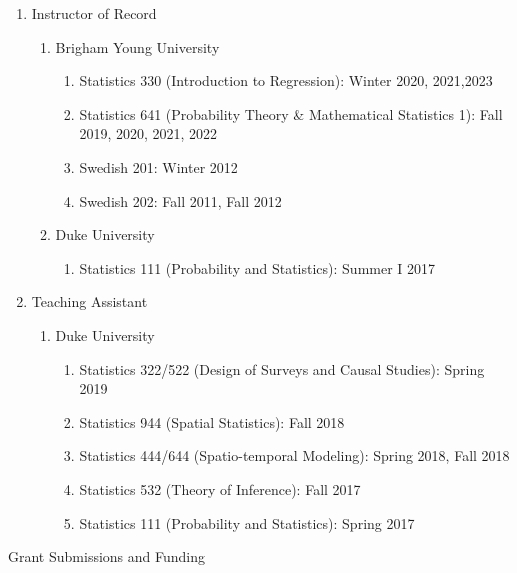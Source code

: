 \documentclass[11pt]{article}
\newcommand{\head}[1]{ %
    \bigskip %
    \begin{large}\begin{bf}{#1}\end{bf}\end{large} %

    \ \\ [-1.3cm] %

    \hrulefill}
\begin{document}
\begin{enumerate}[label=$\bullet$]
\item Instructor of Record
\begin{enumerate}[label=$\cdot$]
\item Brigham Young University
\begin{enumerate}[label=$\cdot$]
\item Statistics 330 (Introduction to Regression): Winter 2020, 2021,2023
\item Statistics 641 (Probability Theory \& Mathematical Statistics 1): Fall 2019, 2020, 2021, 2022
\item Swedish 201: Winter 2012 
\item Swedish 202: Fall 2011, Fall 2012
\end{enumerate}
\item Duke University
\begin{enumerate}[label=$\cdot$]
\item Statistics 111 (Probability and Statistics): Summer I 2017
\end{enumerate}
\end{enumerate}
\item Teaching Assistant
\begin{enumerate}[label=$\cdot$]
\item Duke University
\begin{enumerate}[label=$\cdot$]
\item Statistics 322/522 (Design of Surveys and Causal Studies): Spring 2019
\item Statistics 944 (Spatial Statistics): Fall 2018
\item Statistics 444/644 (Spatio-temporal Modeling): Spring 2018, Fall 2018
\item Statistics 532 (Theory of Inference): Fall 2017
\item Statistics 111 (Probability and Statistics): Spring 2017 
\end{enumerate}
\end{enumerate}
\end{enumerate}

\head{Grant Submissions and Funding}
\end{document}
